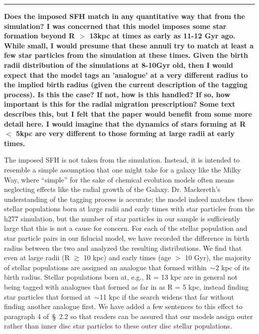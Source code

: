 \documentclass{report}
\newcommand{\breakline}{\noindent\rule{\textwidth}{1pt}}
\begin{document}
\par\null\par 
\breakline 
\par\null\par 
\textbf{
	Does the imposed SFH match in any quantitative way that from the 
	simulation? 
	I was concerned that this model imposes some star formation beyond R $>$ 
	13kpc at times as early as 11-12 Gyr ago. 
	While small, I would presume that these annuli try to match at least a few 
	star particles from the simulation at these times. 
	Given the birth radii distribution of the simulations at 8-10Gyr old, then 
	I would expect that the model tags an 'analogue' at a very different radius 
	to the implied birth radius (given the current description of the tagging 
	process). 
	Is this the case? 
	If not, how is this handled? 
	If so, how important is this for the radial migration prescription? 
	Some text describes this, but I felt that the paper would benefit from some 
	more detail here. 
	I would imagine that the dynamics of stars forming at R $<$ 5kpc are very 
	different to those forming at large radii at early times. 
} 
\par 
The imposed SFH is not taken from the simulation. 
Instead, it is intended to resemble a simple assumption that one might take for 
a galaxy like the Milky Way, where ``simple'' for the sake of chemical 
evolution models often means neglecting effects like the radial growth of the 
Galaxy. 
Dr. Mackereth's understanding of the tagging process is accurate; the model 
indeed matches these stellar populations born at large radii and early times 
with star particles from the h277 simulation, but the number of star particles 
in our sample is sufficiently large that this is not a cause for concern. 
For each of the stellar population and star particle pairs in our fiducial 
model, we have recorded the difference in birth radius between the two and 
analyzed the resulting distributions. 
We find that even at large radii (R $\gtrsim$ 10 kpc) and early times (age $>$ 
10 Gyr), the majority of stellar populations are assigned an analogue that 
formed within~$\sim$2 kpc of its birth radius. 
Stellar populations born at, e.g., R = 13 kpc are in general not being tagged 
with analogues that formed as far in as R = 5 kpc, instead finding star 
particles that formed at~$\sim$11 kpc if the search widens that far without 
finding another analogue first. 
We have added a few sentences to this effect to paragraph 4 of~\S~2.2 so 
that readers can be assured that our models assign outer rather than inner 
disc star particles to these outer disc stellar populations. 
\end{document}
